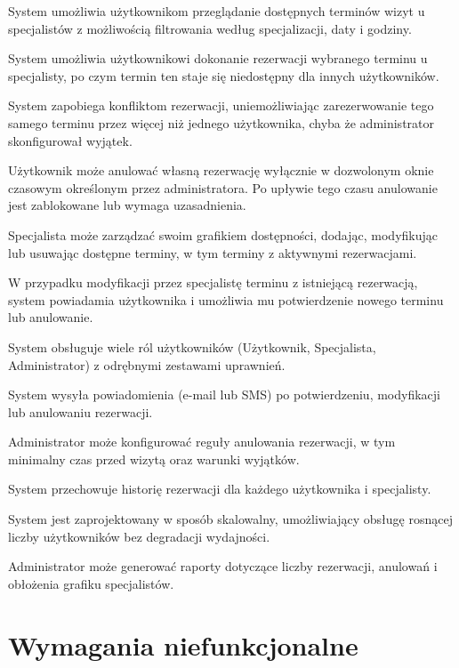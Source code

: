 \documentclass[12pt,a4paper]{article}
\begin{document}
\begin{description}[leftmargin=1.8cm, labelwidth=1.3cm, labelsep=0.5cm, style=nextline]
  \item[FR1] System umożliwia użytkownikom przeglądanie dostępnych terminów wizyt u specjalistów z możliwością filtrowania według specjalizacji, daty i godziny.
  \item[FR2] System umożliwia użytkownikowi dokonanie rezerwacji wybranego terminu u specjalisty, po czym termin ten staje się niedostępny dla innych użytkowników.
  \item[FR3] System zapobiega konfliktom rezerwacji, uniemożliwiając zarezerwowanie tego samego terminu przez więcej niż jednego użytkownika, chyba że administrator skonfigurował wyjątek.
  \item[FR4] Użytkownik może anulować własną rezerwację wyłącznie w dozwolonym oknie czasowym określonym przez administratora. Po upływie tego czasu anulowanie jest zablokowane lub wymaga uzasadnienia.
  \item[FR5] Specjalista może zarządzać swoim grafikiem dostępności, dodając, modyfikując lub usuwając dostępne terminy, w tym terminy z aktywnymi rezerwacjami.
  \item[FR6] W przypadku modyfikacji przez specjalistę terminu z istniejącą rezerwacją, system powiadamia użytkownika i umożliwia mu potwierdzenie nowego terminu lub anulowanie.
  \item[FR7] System obsługuje wiele ról użytkowników (Użytkownik, Specjalista, Administrator) z odrębnymi zestawami uprawnień.
  \item[FR8] System wysyła powiadomienia (e-mail lub SMS) po potwierdzeniu, modyfikacji lub anulowaniu rezerwacji.
  \item[FR9] Administrator może konfigurować reguły anulowania rezerwacji, w tym minimalny czas przed wizytą oraz warunki wyjątków.
  \item[FR10] System przechowuje historię rezerwacji dla każdego użytkownika i specjalisty.
  \item[FR11] System jest zaprojektowany w sposób skalowalny, umożliwiający obsługę rosnącej liczby użytkowników bez degradacji wydajności.
  \item[FR12] Administrator może generować raporty dotyczące liczby rezerwacji, anulowań i obłożenia grafiku specjalistów.
\end{description}

\section{Wymagania niefunkcjonalne}
\end{document}
